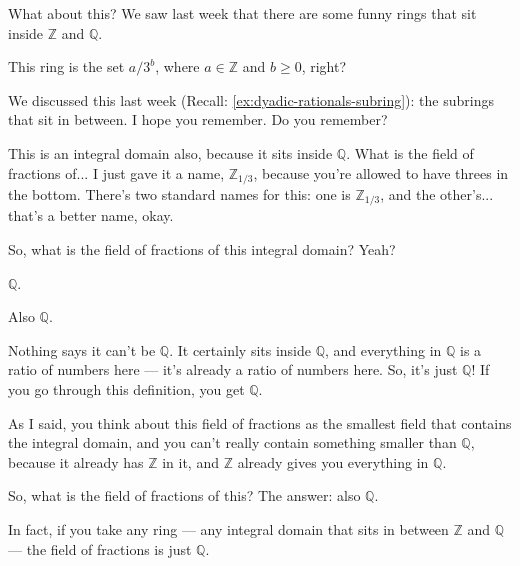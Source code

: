 \begin{speech}[01:11:48 - 01:12:32]
What about this? We saw last week that there are some funny rings that sit inside $\mathbb{Z}$ and $\mathbb{Q}$. 

This ring is the set $a / 3^b$, where $a \in \mathbb{Z}$ and $b \ge 0$, right? 

We discussed this last week (Recall: \cref{ex:dyadic-rationals-subring}): the subrings that sit in between. I hope you remember. Do you remember?

This is an integral domain also,  because it sits inside $\mathbb{Q}$. What is the field of fractions of...  I just gave it a name, $\mathbb{Z}_{1/3}$, because you're allowed to have threes in the bottom. There's two standard names for this: one is $\mathbb{Z}_{1/3}$, and the other's... that's a better name, okay.

So, what is the field of fractions of this integral domain? Yeah?
\end{speech}

\begin{student}
$\mathbb{Q}$.
\end{student}

\begin{speech}[01:12:33 - 01:13:22]
Also $\mathbb{Q}$. 

Nothing says it can't be $\mathbb{Q}$. It certainly sits inside $\mathbb{Q}$, and everything in $\mathbb{Q}$ is a ratio of numbers here --- it's already a ratio of numbers here. So, it's just $\mathbb{Q}$! If you go through this definition, you get $\mathbb{Q}$.

As I said, you think about this field of fractions as the smallest field that contains the integral domain, and you can't really contain something smaller than $\mathbb{Q}$, because it already has $\mathbb{Z}$ in it, and $\mathbb{Z}$ already gives you everything in $\mathbb{Q}$.

So, what is the field of fractions of this? The answer: also $\mathbb{Q}$.

In fact, if you take any ring --- any integral domain that sits in between $\mathbb{Z}$ and $\mathbb{Q}$ --- the field of fractions is just $\mathbb{Q}$.
\end{speech}

